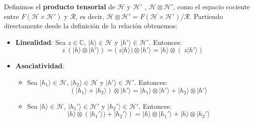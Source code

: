 \vspace{5pt}
Definimos el \textbf{producto tensorial} de $\mathscr{H}$ y $\mathscr{H}'$ , $\mathscr{H} \otimes \mathscr{H}'$, como el espacio cociente entre $F(\mathscr{H} \times \mathscr{H}')$ y $\mathscr{R}$, es decir, $\mathscr{H} \otimes \mathscr{H}' = F(\mathscr{H} \times \mathscr{H}')/\mathscr{R}$. Partiendo directamente desde la definición de la relación obtenemos:

\begin{itemize}
    \item \textbf{Linealidad}: Sea $z\in\mathbb{C}$, $|h\rangle\in\mathscr{H}$ y $|h'\rangle\in\mathscr{H}'$. Entonces:
        \begin{equation*}
            z\:(|h\rangle \otimes |h'\rangle) = (\:z|h\rangle) \otimes |h'\rangle = |h\rangle \otimes (\:z|h'\rangle)
        \end{equation*}
        
    \newpage
    \item \textbf{Asociatividad}:
    \begin{itemize}
        \item Sea $|h_{1}\rangle\in\mathscr{H}$, $|h_{2}\rangle\in\mathscr{H}$ y $|h'\rangle\in\mathscr{H}'$. Entonces:
            \begin{equation*}
                (|h_{1}\rangle + |h_{2}\rangle)\otimes|h'\rangle = |h_{1}\rangle \otimes|h'\rangle + |h_{2}\rangle \otimes|h'\rangle
            \end{equation*}

        \item Sea $|h\rangle\in\mathscr{H}$, $|h_{1}'\rangle\in\mathscr{H}'$ y $|h_{2}'\rangle\in\mathscr{H}'$. Entonces:
            \begin{equation*}
                |h\rangle \otimes (|h_{1}'\rangle) + |h_{2}'\rangle) = |h\rangle \otimes|h_{1}'\rangle + |h\rangle \otimes|h_{2}'\rangle
            \end{equation*}
    \end{itemize}
\end{itemize}


